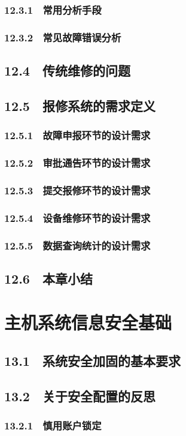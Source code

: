 \documentclass[12pt,UTF8]{ctexbook}
\begin{document}
{\subsection{12.3.1　常用分析手段}
\subsection{12.3.2　常见故障错误分析}
\section{12.4　传统维修的问题}
\section{12.5　报修系统的需求定义}
\subsection{12.5.1　故障申报环节的设计需求}
\subsection{12.5.2　审批通告环节的设计需求}
\subsection{12.5.3　提交报修环节的设计需求}
\subsection{12.5.4　设备维修环节的设计需求}
\subsection{12.5.5　数据查询统计的设计需求}
\section{12.6　本章小结}
\chapter{主机系统信息安全基础}
\section{13.1　系统安全加固的基本要求}
\section{13.2　关于安全配置的反思}
\subsection{13.2.1　慎用账户锁定}
}
\end{document}
